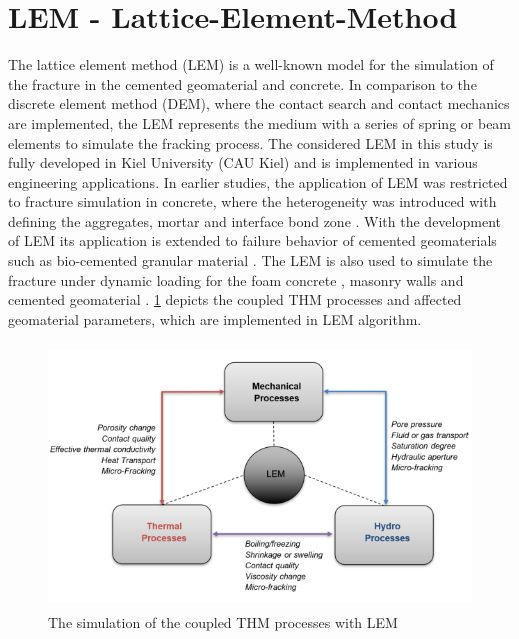 \section{LEM - Lattice-Element-Method}
The lattice element method (LEM) is a well-known model for the simulation of the fracture in the cemented geomaterial and concrete. In comparison to the discrete element method (DEM), where the contact search and contact mechanics are implemented, the LEM represents the medium with a series of spring or beam elements to simulate the fracking process. The considered LEM in this study is fully developed in Kiel University (CAU Kiel) and is implemented in various engineering applications. In earlier studies, the application of LEM was restricted to fracture simulation in concrete, where the heterogeneity was introduced with defining the aggregates, mortar and interface bond zone \cite{Liuetal2007, Pradoetal2003, Vanmieretal2002}. With the development of LEM its application is extended to failure behavior of cemented geomaterials such as bio-cemented granular material \cite{Rizvietal2019a}. The LEM is also used to simulate the fracture under dynamic loading for the foam concrete \cite{Rizvietal2018a}, masonry walls \cite{Sattarietal2019a} and cemented geomaterial \cite{ Rizvietal2018c, Rizvietal2020a}.  \ref{fig:Amir_LEM_Code} depicts the coupled THM processes and affected geomaterial parameters, which are implemented in LEM algorithm.

\begin{figure}[!ht]
\centering
\includegraphics[width=12cm,height=7cm]{figures/Amir_LEM_Code.png}
\caption{The simulation of the coupled THM processes with LEM}
\label{fig:Amir_LEM_Code}
\end{figure} 

